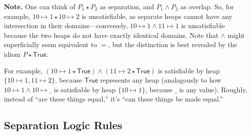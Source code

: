 \documentclass[11pt]{article}
\newcommand{\True}{\mathsf{True}}
\begin{document}
\textbf{Note.} One can think of $P_1 \star P_2$ as separation, and $P_1 \land P_2$ as overlap.
So, for example, $10 \mapsto 1 \star 10 \mapsto 2$ is unsatisfiable, as separate heaps cannot have any intersection in their domains---conversely, $10 \mapsto 1 \land 11 \mapsto 1$ is unsatisfiable because the two heaps do not have exactly identical domains.
Note that $\land$ might superficially seem equivalent to $=$, but the distinction is best revealed by the idiom $P \star \True$.

For example, $(10 \mapsto 1 \star \True) \land (11 \mapsto 2 \star \True)$ is
satisfiable by heap $\{10 \mapsto 1, 11 \mapsto 2\}$, because $\True$ represents
any heap (analagously to how $10 \mapsto 1 \land 10 \mapsto \_$ is satisfiable
by heap $\{10 \mapsto 1\}$, because $\_$ is any value).
Roughly, instead of ``are these things equal,'' it's ``can these things be made
equal.''

\subsection{Separation Logic Rules}
\end{document}
